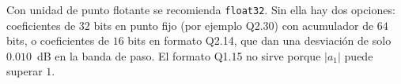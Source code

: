Con unidad de punto flotante se recomienda \texttt{float32}. Sin ella hay dos opciones: coeficientes de $32$ bits en punto fijo (por ejemplo Q2.30) con acumulador de $64$ bits, o coeficientes de $16$ bits en formato Q2.14, que dan una desviación de solo $0.010$~dB en la banda de paso. El formato Q1.15 no sirve porque $|a_1|$ puede superar $1$.